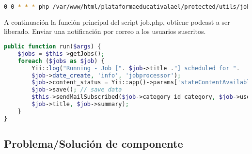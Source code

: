 \begin{itemize}
\begin{lstlisting}[language=bash, caption={Comando para ejecución de tarea.}]
0 0 * * * php /var/www/html/plataformaeducativalael/protected/utils/job.php job
\end{lstlisting}

A continuación la función principal del script job.php, obtiene podcast
a ser liberado. Enviar una notificación por correo a los usuarios suscritos.

\begin{lstlisting}[language=PHP, caption={Método principal de clase JobCommand.}]
public function run($args) {
    $jobs = $this->getJobs();
    foreach ($jobs as $job) {
        Yii::log("Running - Job [". $job->title ."] scheduled for ".
        $job->date_create, 'info', 'jobprocessor');
        $job->content_status = Yii::app()->params['stateContentAvailable'];
        $job->save(); // save data
        $this->sendMailSubscribed($job->category_id_category, $job->user_id_user,
        $job->title, $job->summary);
    }
}
\end{lstlisting}

\end{itemize}

\subsection{Problema/Solución de componente}

